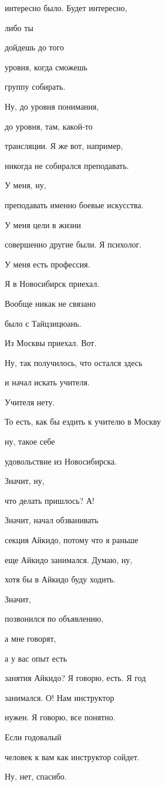 интересно было. Будет интересно,

либо ты

дойдешь до того

уровня, когда сможешь

группу собирать.

Ну, до уровня понимания,

до уровня, там, какой-то

трансляции. Я же вот, например,

никогда не собирался преподавать.

У меня, ну,

преподавать именно боевые искусства.

У меня цели в жизни

совершенно другие были. Я психолог.

У меня есть профессия.

Я в Новосибирск приехал.

Вообще никак не связано

было с Тайцзицюань.

Из Москвы приехал. Вот.

Ну, так получилось, что остался здесь

и начал искать учителя.

Учителя нету.

То есть, как бы ездить к учителю в Москву

ну, такое себе

удовольствие из Новосибирска.

Значит, ну,

что делать пришлось? А!

Значит, начал обзванивать

секция Айкидо, потому что я раньше

еще Айкидо занимался. Думаю, ну,

хотя бы в Айкидо буду ходить.

Значит,

позвонился по объявлению,

а мне говорят,

а у вас опыт есть

занятия Айкидо? Я говорю, есть. Я год

занимался. О! Нам инструктор

нужен. Я говорю, все понятно.

Если годовалый

человек к вам как инструктор сойдет.

Ну, нет, спасибо.


